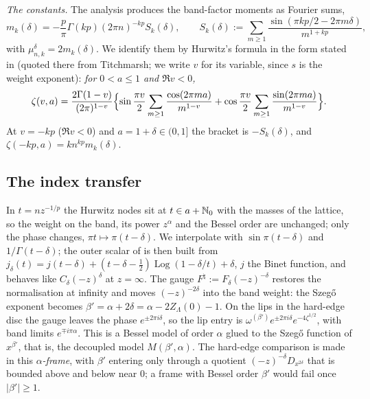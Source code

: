 \emph{The constants.} The analysis produces the band-factor moments as Fourier sums,
\begin{equation}\label{eq:fourier}
  m_k(\delta)=-\frac p\pi\Gamma(kp)(2\pi n)^{-kp}S_k(\delta),\qquad S_k(\delta):=\sum_{m\ge1}\frac{\sin(\pi kp/2-2\pi m\delta)}{m^{1+kp}},
\end{equation}
with $\mu^\delta_{n,k}=2m_k(\delta)$. We identify them by Hurwitz's formula in the form stated in \cite[Theorem~1.1]{DixitKumar} (quoted there from
Titchmarsh; we write $v$ for its variable, since $s$ is the weight exponent): \emph{for $0<a\le1$ and $\Re v<0$,}
\[
  \zeta(v,a)=\frac{2\Gamma(1-v)}{(2\pi)^{1-v}}\Bigl\{\sin\frac{\pi v}2\sum_{m\ge1}\frac{\cos(2\pi ma)}{m^{1-v}}
  +\cos\frac{\pi v}2\sum_{m\ge1}\frac{\sin(2\pi ma)}{m^{1-v}}\Bigr\}.
\]
At $v=-kp$ ($\Re v<0$) and $a=1+\delta\in(0,1]$ the bracket is $-S_k(\delta)$, and $\zeta(-kp,a)=kn^{kp}m_k(\delta)$.

\subsection{The index transfer}\label{sec:H-mechanism}
In $t=nz^{-1/p}$ the Hurwitz nodes sit at $t\in a+\mathbb{N}_0$ with the masses of the lattice, so the weight on the band, its power $z^\alpha$ and the
Bessel order are unchanged; only the phase changes, $\pi t\mapsto\pi(t-\delta)$. We interpolate with $\sin\pi(t-\delta)$ and $1/\Gamma(t-\delta)$;
the outer scalar of \cite{PaperII} is then built from $j_\delta(t)=j(t-\delta)+(t-\delta-\frac12)\operatorname{Log}(1-\delta/t)+\delta$, $j$ the Binet function,
and behaves like $C_\delta(-z)^\delta$ at $z=\infty$. The gauge $F^\natural:=F_\delta(-z)^{-\delta}$ restores the normalisation at infinity and moves
$(-z)^{-2\delta}$ into the band weight: the Szeg\H{o} exponent becomes $\beta'=\alpha+2\delta=\alpha-2Z_\Lambda(0)-1$. On the lips in the hard-edge
disc the gauge leaves the phase $e^{\pm2\pi i\delta}$, so the lip entry is $\omega^{(\beta')}e^{\pm2\pi i\delta}e^{-4\zeta^{1/2}}$, with band limits
$e^{\mp i\pi\alpha}$. This is a Bessel model of order $\alpha$ glued to the Szeg\H{o} function of $x^{\beta'}$, that is, the decoupled model
$M(\beta',\alpha)$. The
hard-edge comparison is made in this \emph{$\alpha$-frame}, with $\beta'$ entering only through a quotient $(-z)^{-\delta}D_{x^{2\delta}}$ that is
bounded above and below near $0$; a frame with Bessel order $\beta'$ would fail once $|\beta'|\ge1$.


